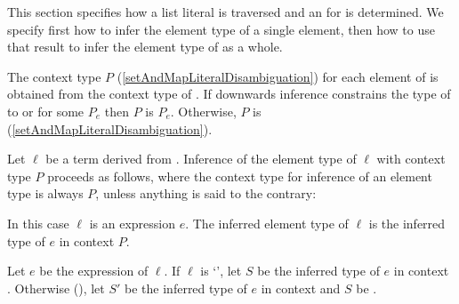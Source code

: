 \documentclass[makeidx]{article}
\begin{document}
{\LMHash{}%
This section specifies how a list literal  is traversed and an
for  is determined.
We specify first how to infer the element type of a single element,
then how to use that result to infer
the element type of  as a whole.

\LMHash{}%
The context type $P$
(\ref{setAndMapLiteralDisambiguation})
for each element of  is
obtained from the context type of .
If downwards inference constrains the type of 
to  or  for some $P_e$
then $P$ is $P_e$.
Otherwise, $P$ is \FreeContext{}
(\ref{setAndMapLiteralDisambiguation}).

\LMHash{}%
Let $\ell$ be a term derived from .
Inference of the element type of $\ell$ with context type $P$
proceeds as follows,
where the context type for inference of an element type is always $P$,
unless anything is said to the contrary:

\LMHash{}%
In this case $\ell$ is an expression $e$.
The inferred element type of $\ell$ is
the inferred type of $e$ in context $P$.
\EndCase

\LMHash{}%
\EndCase

\LMHash{}%
Let $e$ be the expression of $\ell$.
If $\ell$ is `',
let $S$ be the inferred type of $e$ in context .
Otherwise
(),
let $S'$ be the inferred type of $e$ in context 
and $S$ be .

}
\end{document}

